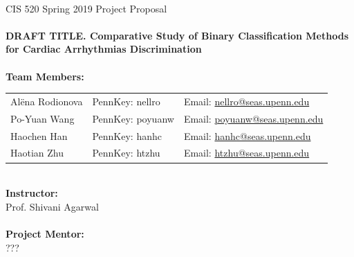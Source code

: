 \renewcommand{\headrulewidth}{0pt}
\renewcommand{\headrulewidth}{0pt}

\thispagestyle{fancy}
\mbox{}\vspace{1cm}\\
CIS 520 Spring 2019 Project Proposal\\
\\
{\Large \textbf{DRAFT TITLE. Comparative Study of Binary 
Classification 
Methods 
for Cardiac Arrhythmias Discrimination}} 
\\
\vspace{5cm}\\
%
%
%
\textbf{Team Members:}\\
%
\begin{tabular}{lll}%
	Al\"{e}na Rodionova & 
	PennKey: nellro &
	Email: 
	\href{mailto:nellro@seas.upenn.edu}{nellro@seas.upenn.edu} \\
	Po-Yuan Wang & 
	PennKey: poyuanw & 
	Email:
	\href{mailto:poyuanw@seas.upenn.edu}{poyuanw@seas.upenn.edu}\\
	Haochen Han & 
	PennKey: hanhc& 
	Email: \href{mailto:hanhc@seas.upenn.edu}{hanhc@seas.upenn.edu}\\
	Haotian Zhu &
	PennKey: htzhu& 
	Email: \href{mailto:htzhu@seas.upenn.edu}{htzhu@seas.upenn.edu}
\end{tabular}
\vspace{1cm}\\
\textbf{Instructor:}\\
Prof. Shivani Agarwal\\
%
\vspace{1cm}\\
\textbf{Project Mentor:}\\
???

\newpage